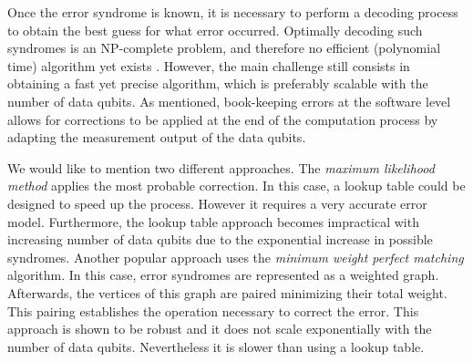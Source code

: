 Once the error syndrome is known, it is necessary to perform a decoding process
to obtain the best guess for what error occurred. Optimally decoding such
syndromes is an NP-complete problem, and therefore no efficient (polynomial
time) algorithm yet exists \cite{Berlekamp}. However, the main challenge still
consists in obtaining a fast yet precise algorithm, which is preferably scalable
with the number of data qubits. As mentioned, book-keeping errors at the
software level allows for corrections to be applied at the end of the
computation process by adapting the measurement output of the data qubits.

We would like to mention two different approaches. The \textit{maximum
  likelihood method} \cite{terhal15} applies the most probable correction. In
this case, a lookup table could be designed to speed up the process. However it
requires a very accurate error model. Furthermore, the lookup table approach
becomes impractical with increasing number of data qubits due to the exponential
increase in possible syndromes. Another popular approach uses the
\textit{minimum weight perfect matching} \cite{edmonds_1965} algorithm. In this
case, error syndromes are represented as a weighted graph. Afterwards, the
vertices of this graph are paired minimizing their total weight. This pairing
establishes the operation necessary to correct the error. This approach is shown
to be robust and it does not scale exponentially with the number of data qubits.
Nevertheless it is slower than using a lookup table.





